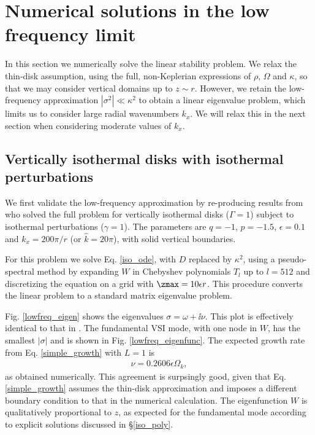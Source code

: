 \section{Numerical solutions in the low frequency limit}
In this section we numerically solve the linear stability problem.  
We relax the thin-disk assumption, using the full, non-Keplerian
expressions of $\rho$, $\Omega$ and $\kappa$, so that we may consider
vertical domains up to $z\sim r$. However, we retain the low-frequency
approximation $|\sigma^2|\ll\kappa^2$ to obtain a linear eigenvalue
problem, which limits us to consider large radial wavenumbers
$k_x$. We will relax this in the next section when considering
moderate values of $k_x$. %



\subsection{Vertically isothermal disks with isothermal
  perturbations}\label{vertiso_pertiso} 
We first validate the low-frequency approximation by re-producing
results from \cite{mcnally14} who solved the full problem for
vertically isothermal disks ($\Gamma=1$) subject to isothermal
perturbations ($\gamma=1$). The parameters are $q=-1$,
$p=-1.5$, $\epsilon=0.1$ and $k_x = 200\pi/r$ (or $\hat{k} = 20\pi$),
with solid vertical boundaries. 

For this problem we solve Eq. \ref{iso_ode}, with $D$ replaced by
$\kappa^2$, using a pseudo-spectral
method by expanding $W$ in Chebyshev polynomials $T_l$ up to $l=512$
and discretizing the equation on a grid with
$\zmax=10\epsilon r$. This procedure converts the linear problem
to a standard matrix eigenvalue problem.   

Fig. \ref{lowfreq_eigen} shows the eigenvalues $\sigma = \omega +
\ii\nu$. This plot is effectively identical to that in
\cite{mcnally14}. The fundamental VSI mode, with one node in $W$, has
the smallest $|\sigma|$ and is shown in Fig. \ref{lowfreq_eigenfunc}.  
The expected growth rate from Eq. \ref{simple_growth} with 
$L=1$ is  
\begin{align*}
  \nu = 0.2606\epsilon\Omega_k,
\end{align*}
as obtained numerically. This agreement is surpsingly good, given that
Eq. \ref{simple_growth} assumes the thin-disk approximation and
imposes a different boundary condition to that in the numerical
calculation. The eigenfunction $W$ is qualitatively proportional to
$z$, as expected for the fundamental mode according to explicit
solutions discussed in \S\ref{iso_poly}.    


